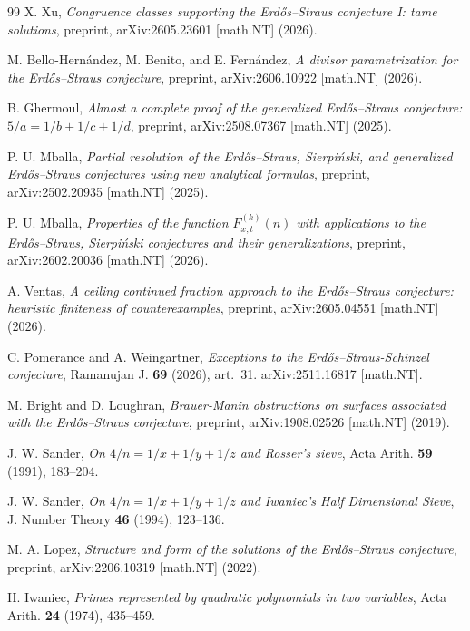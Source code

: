 \documentclass[11pt, a4paper]{article}
\theoremstyle{plain}
\theoremstyle{definition}
\begin{document}
\begin{thebibliography}{99}
 X. Xu, \textit{Congruence classes supporting the Erd\H{o}s--Straus conjecture I: tame solutions}, preprint, arXiv:2605.23601 [math.NT] (2026).

 M. Bello-Hern\'{a}ndez, M. Benito, and E. Fern\'{a}ndez, \textit{A divisor parametrization for the Erd\H{o}s--Straus conjecture}, preprint, arXiv:2606.10922 [math.NT] (2026).

 B. Ghermoul, \textit{Almost a complete proof of the generalized Erd\H{o}s--Straus conjecture: $5/a=1/b+1/c+1/d$}, preprint, arXiv:2508.07367 [math.NT] (2025).

 P. U. Mballa, \textit{Partial resolution of the Erd\H{o}s--Straus, Sierpi\'{n}ski, and generalized Erd\H{o}s--Straus conjectures using new analytical formulas}, preprint, arXiv:2502.20935 [math.NT] (2025).

 P. U. Mballa, \textit{Properties of the function $F_{x,t}^{(k)}(n)$ with applications to the Erd\H{o}s--Straus, Sierpi\'{n}ski conjectures and their generalizations}, preprint, arXiv:2602.20036 [math.NT] (2026).

 A. Ventas, \textit{A ceiling continued fraction approach to the Erd\H{o}s--Straus conjecture: heuristic finiteness of counterexamples}, preprint, arXiv:2605.04551 [math.NT] (2026).

 C. Pomerance and A. Weingartner, \textit{Exceptions to the Erd\H{o}s--Straus-Schinzel conjecture}, Ramanujan J. \textbf{69} (2026), art.~31. arXiv:2511.16817 [math.NT].

 M. Bright and D. Loughran, \textit{Brauer-Manin obstructions on surfaces associated with the Erd\H{o}s--Straus conjecture}, preprint, arXiv:1908.02526 [math.NT] (2019).

 J. W. Sander, \textit{On $4/n=1/x+1/y+1/z$ and Rosser's sieve}, Acta Arith. \textbf{59} (1991), 183--204.

 J. W. Sander, \textit{On $4/n=1/x+1/y+1/z$ and Iwaniec's Half Dimensional Sieve}, J. Number Theory \textbf{46} (1994), 123--136.

 M. A. Lopez, \textit{Structure and form of the solutions of the Erd\H{o}s--Straus conjecture}, preprint, arXiv:2206.10319 [math.NT] (2022).

 H. Iwaniec, \textit{Primes represented by quadratic polynomials in two variables}, Acta Arith. \textbf{24} (1974), 435--459.


\end{thebibliography}
\end{document}
